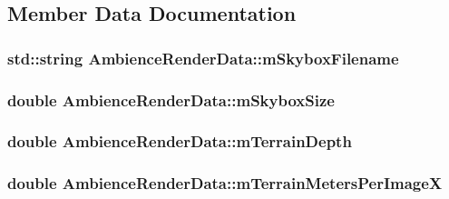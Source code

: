 \subsection{Member Data Documentation}
\hypertarget{class_ambience_render_data_a462dce5cb2e535c15a0fbf94d99220e3}{
\subsubsection[{m\-Skybox\-Filename}]{\setlength{\rightskip}{0pt plus 5cm}std\-::string Ambience\-Render\-Data\-::m\-Skybox\-Filename}}\label{class_ambience_render_data_a462dce5cb2e535c15a0fbf94d99220e3}
\hypertarget{class_ambience_render_data_a619be04e63ef41deac443cabba9c8d2f}{
\subsubsection[{m\-Skybox\-Size}]{\setlength{\rightskip}{0pt plus 5cm}double Ambience\-Render\-Data\-::m\-Skybox\-Size}}\label{class_ambience_render_data_a619be04e63ef41deac443cabba9c8d2f}
\hypertarget{class_ambience_render_data_a18b979f952900e973802f2d4cca82b13}{
\subsubsection[{m\-Terrain\-Depth}]{\setlength{\rightskip}{0pt plus 5cm}double Ambience\-Render\-Data\-::m\-Terrain\-Depth}}\label{class_ambience_render_data_a18b979f952900e973802f2d4cca82b13}
\hypertarget{class_ambience_render_data_a05eaae9de570dab5a7bce2454b257945}{
\subsubsection[{m\-Terrain\-Meters\-Per\-Image\-X}]{\setlength{\rightskip}{0pt plus 5cm}double Ambience\-Render\-Data\-::m\-Terrain\-Meters\-Per\-Image\-X}}\label{class_ambience_render_data_a05eaae9de570dab5a7bce2454b257945}
